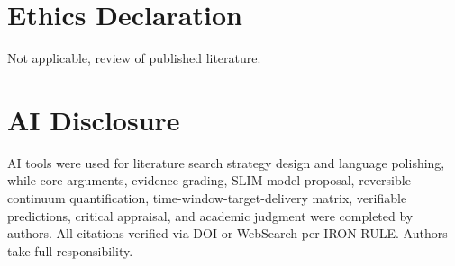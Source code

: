 \documentclass[review]{elsarticle}
\begin{document}
\section*{Ethics Declaration}
Not applicable, review of published literature.

\section*{AI Disclosure}
AI tools were used for literature search strategy design and language polishing, while core arguments, evidence grading, SLIM model proposal, reversible continuum quantification, time-window-target-delivery matrix, verifiable predictions, critical appraisal, and academic judgment were completed by authors. All citations verified via DOI or WebSearch per IRON RULE. Authors take full responsibility.



\end{document}
